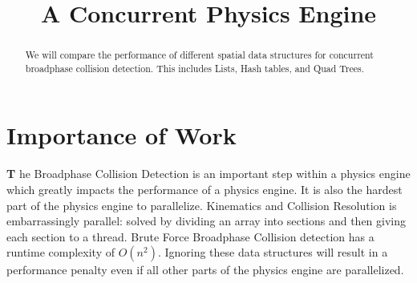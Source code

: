 \documentclass[conference]{IEEEtran}
\begin{document}
\title{A Concurrent Physics Engine}


\author{
\and
{}
\and
{}
}

\maketitle

\begin{abstract}
We will compare the performance of different spatial data structures for concurrent broadphase collision detection. This includes Lists, Hash tables, and Quad Trees.
\end{abstract}

\IEEEpeerreviewmaketitle



\section{Importance of Work}

\lettrine[findent=2pt]{\textbf{T}}{ }he Broadphase Collision Detection is an important step within a physics engine which greatly impacts the performance of a physics engine. It is also the hardest part of the physics engine to parallelize. Kinematics and Collision Resolution is embarrassingly parallel: solved by dividing an array into sections and then giving each section to a thread. Brute Force Broadphase Collision detection has a runtime complexity of $O(n^2)$. Ignoring these data structures will result in a performance penalty even if all other parts of the physics engine are parallelized.
\end{document}
